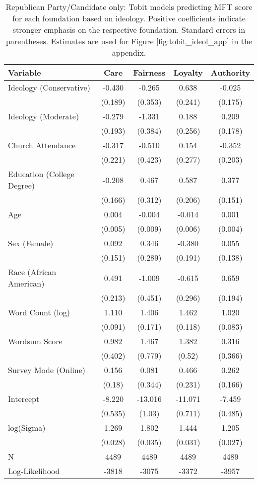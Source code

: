 \begin{table}[ht]
\centering
\caption[Republican Party/Candidate only: Tobit models predicting MFT score for each foundation based 
           on ideology]{Republican Party/Candidate only: Tobit models predicting MFT score for each foundation based 
           on ideology. Positive coefficients indicate stronger emphasis on the respective 
           foundation. Standard errors in parentheses. Estimates are used for  
           Figure \ref{fig:tobit_ideol_app} in the appendix.} 
\label{tab:tobit_rep}
\begingroup\footnotesize
\begin{tabular}{lcccc}
  \hline
Variable & Care & Fairness & Loyalty & Authority \\ 
  \hline
Ideology (Conservative) & -0.430 &  -0.265 &   0.638 & -0.025 \\ 
   & (0.189) & (0.353) & (0.241) & (0.175) \\ 
  Ideology (Moderate) & -0.279 &  -1.331 &   0.188 &  0.209 \\ 
   & (0.193) & (0.384) & (0.256) & (0.178) \\ 
  Church Attendance & -0.317 &  -0.510 &   0.154 & -0.352 \\ 
   & (0.221) & (0.423) & (0.277) & (0.203) \\ 
  Education (College Degree) & -0.208 &   0.467 &   0.587 &  0.377 \\ 
   & (0.166) & (0.312) & (0.206) & (0.151) \\ 
  Age &  0.004 &  -0.004 &  -0.014 &  0.001 \\ 
   & (0.005) & (0.009) & (0.006) & (0.004) \\ 
  Sex (Female) &  0.092 &   0.346 &  -0.380 &  0.055 \\ 
   & (0.151) & (0.289) & (0.191) & (0.138) \\ 
  Race (African American) &  0.491 &  -1.009 &  -0.615 &  0.659 \\ 
   & (0.213) & (0.451) & (0.296) & (0.194) \\ 
  Word Count (log) &  1.110 &   1.406 &   1.462 &  1.020 \\ 
   & (0.091) & (0.171) & (0.118) & (0.083) \\ 
  Wordsum Score &  0.982 &   1.467 &   1.382 &  0.316 \\ 
   & (0.402) & (0.779) & (0.52) & (0.366) \\ 
  Survey Mode (Online) &  0.156 &   0.081 &   0.466 &  0.262 \\ 
   & (0.18) & (0.344) & (0.231) & (0.166) \\ 
  Intercept & -8.220 & -13.016 & -11.071 & -7.459 \\ 
   & (0.535) & (1.03) & (0.711) & (0.485) \\ 
  log(Sigma) &  1.269 &   1.802 &   1.444 &  1.205 \\ 
   & (0.028) & (0.035) & (0.031) & (0.027) \\ 
   \hline
N & 4489 & 4489 & 4489 & 4489 \\ 
  Log-Likelihood & -3818 & -3075 & -3372 & -3957 \\ 
   \hline
\end{tabular}
\endgroup
\end{table}

